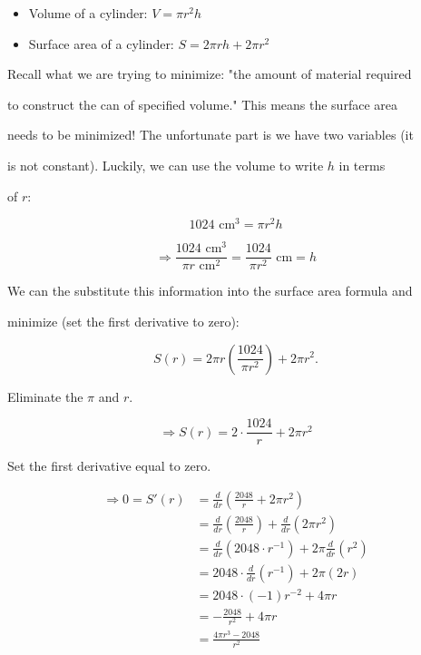 \begin{itemize}
    \item Volume of a cylinder: $V=\pi r^{2}h$
    \item Surface area of a cylinder: $S=2\pi rh+2\pi r^{2}$
\end{itemize}

Recall what we are trying to minimize: "the amount of material required

to construct the can of specified volume." This means the surface area

needs to be minimized! The unfortunate part is we have two variables (it

is not constant). Luckily, we can use the volume to write $h$ in terms

of $r$:



$$1024\text{ cm}^{3}=\pi r^{2}h$$



$$\Rightarrow \frac{1024\text{ cm}^{3}}{\pi {r\text{ cm}}^{2}}=\frac{1024}{\pi r^{2}}\text{ cm}=h$$



We can the substitute this information into the surface area formula and

minimize (set the first derivative to zero):



$$S(r)=2\pi r\left(\frac{1024}{\pi r^{2}}\right)+2\pi r^{2}.$$

 

Eliminate the $\pi$ and $r.$



$$\Rightarrow S(r)=2\cdot\frac{1024}{r}+2\pi r^{2}$$



Set the first derivative equal to zero.



\begin{align}
 \Rightarrow0=S'(r)&=\frac{d}{dr}\left(\frac{2048}{r}+2\pi r^{2}\right) \\\ &=\frac{d}{dr}\left(\frac{2048}{r}\right)+\frac{d}{dr}\left(2\pi r^{2}\right) \\\ &=\frac{d}{dr}\left(2048\cdot{r}^{-1}\right)+2\pi\frac{d}{dr}\left(r^{2}\right) \\\ &=2048\cdot\frac{d}{dr}\left({r}^{-1}\right)+2\pi\left(2r\right) \\\ &=2048\cdot(-1){r}^{-2}+4\pi r \\\ &=-\frac{2048}{{r}^{2}}+4\pi r \\\ &=\frac{4\pi r^{3}-2048}{{r}^{2}}
\end{align}



